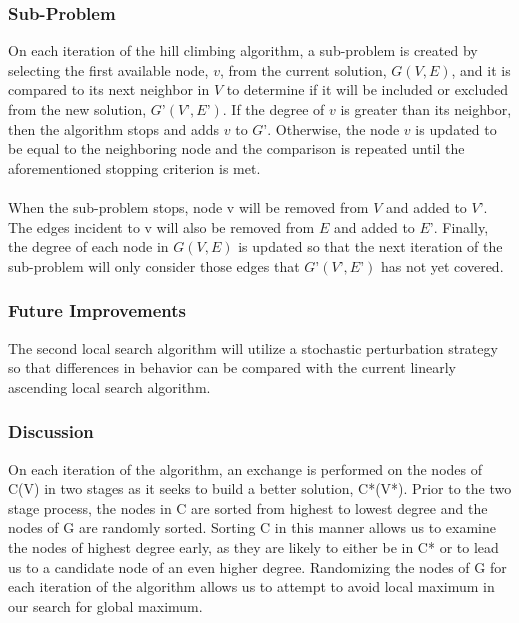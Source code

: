 \documentclass{sig-alternate-05-2015}
\begin{document}
\subsubsection{Sub-Problem}
On each iteration of the hill climbing algorithm, a sub-problem is created by selecting the first available node, $v$, from the current solution, $G(V,E)$, and it is compared to its next neighbor in $V$ to determine if it will be included or excluded from the new solution, $G’(V’,E’)$.  If the degree of $v$ is greater than its neighbor, then the algorithm stops and adds $v$ to $G’$.  Otherwise, the node $v$ is updated to be equal to the neighboring node and the comparison is repeated until the aforementioned stopping criterion is met.
\\
\\
When the sub-problem stops, node v will be removed from $V$ and added to $V’$.  The edges incident to v will also be removed from $E$ and added to $E’$.  Finally, the degree of each node in $G(V,E)$ is updated so that the next iteration of the sub-problem will only consider those edges that $G’(V’,E’)$ has not yet covered.
\subsubsection{Future Improvements}
The second local search algorithm will utilize a stochastic perturbation strategy so that differences in behavior can be compared with the current linearly ascending local search algorithm.

\subsubsection{Discussion}
On each iteration of the algorithm, an exchange is performed on the nodes of C(V) in two stages as it seeks to build a better solution, C*(V*). Prior to the two stage process, the nodes in C are sorted from highest to lowest degree and the nodes of G are randomly sorted. Sorting C in this manner allows us to examine the nodes of highest degree early, as they are likely to either be in C* or to lead us to a candidate node of an even higher degree.  Randomizing the nodes of G for each iteration of the algorithm allows us to attempt to avoid local maximum in our search for global maximum.  
\\
\\
\end{document}
